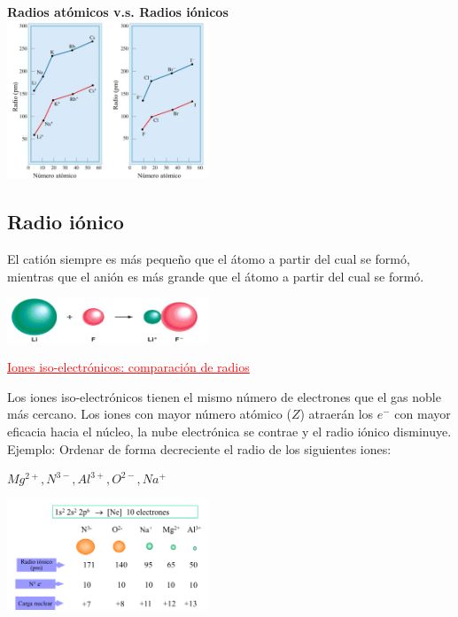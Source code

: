         \begin{center} \textbf{Radios atómicos v.s. Radios iónicos} \\[10pt] \includegraphics[width=6cm]{./imagenes/radioIonicoVSAtomico.png}  \end{center}

    \subsection{Radio iónico}
        \indent El catión siempre es más pequeño que el átomo a partir del cual se formó, mientras que el anión es más grande que el átomo a partir del cual se formó.
        \begin{center} \includegraphics[width=6cm]{./imagenes/radioIonicos.png} \end{center}
        \begin{center} \textcolor{red}{\underline{Iones iso-electrónicos: comparación de radios}} \end{center}

        \indent Los iones iso-electrónicos tienen el mismo número de electrones que el gas noble más cercano. Los iones con mayor número atómico ($Z$) atraerán los $e^-$ con mayor eficacia hacia el núcleo, la nube electrónica se contrae y el radio iónico disminuye. \\
        \indent Ejemplo: Ordenar de forma decreciente el radio de los siguientes iones: 
        \begin{center} $Mg^{2+}, N^{3-}, Al^{3+}, O^{2-}, Na^{+}$ \end{center}
        \begin{center} \includegraphics[width=6cm]{./imagenes/radiosIonesEjemplo.png} \end{center}

